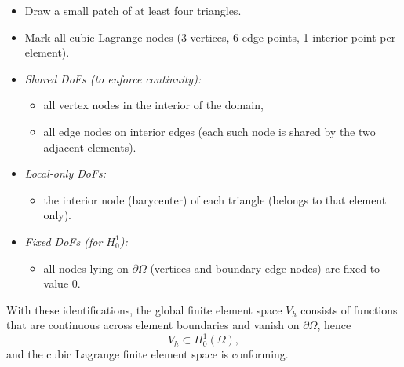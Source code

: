 \begin{itemize}
    \item Draw a small patch of at least four triangles.
    \item Mark all cubic Lagrange nodes (3 vertices, 6 edge points, 1 interior point per element).
    \item \emph{Shared DoFs (to enforce continuity):}
          \begin{itemize}
              \item all vertex nodes in the interior of the domain,
              \item all edge nodes on interior edges (each such node is shared by the two adjacent
                    elements).
          \end{itemize}
    \item \emph{Local-only DoFs:}
          \begin{itemize}
              \item the interior node (barycenter) of each triangle (belongs to that element only).
          \end{itemize}
    \item \emph{Fixed DoFs (for $H^1_0$):}
          \begin{itemize}
              \item all nodes lying on $\partial\Omega$ (vertices and boundary edge nodes) are fixed to
                    value $0$.
          \end{itemize}
\end{itemize}
With these identifications, the global finite element space $V_h$ consists of functions
that are continuous across element boundaries and vanish on $\partial\Omega$, hence
\[
    V_h \subset H^1_0(\Omega),
\]
and the cubic Lagrange finite element space is conforming.
